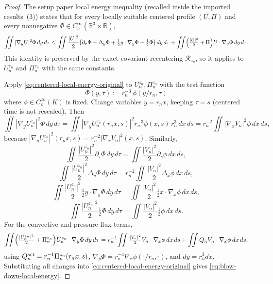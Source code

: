 \documentclass[11pt]{amsart}
\numberwithin{equation}{section}
\theoremstyle{plain}
\theoremstyle{definition}
\theoremstyle{remark}
\newcommand{\calR}{\mathcal R}
\begin{document}
\begin{proof}
The setup paper local energy inequality (recalled inside the imported results
\,(3)) states that for every locally suitable
centered profile \((U,\Pi)\) and every nonnegative
\(\Phi\in C_c^\infty(\mathbb R^3\times\mathbb R)\),
\begin{equation}\label{eq:centered-local-energy-original}
   \iint |\nabla_y U|^2\Phi\,dy\,d\tau
   \le
   \iint \frac{|U|^2}{2}\bigl(\partial_\tau\Phi+\Delta_y\Phi
      +\tfrac12 y\cdot\nabla_y\Phi+\tfrac12\Phi\bigr)\,dy\,d\tau
   +\iint
   \Bigl(\tfrac{|U|^2}{2}+\Pi\Bigr)U\cdot\nabla_y\Phi\,dy\,d\tau .
\end{equation}
This identity is preserved by the exact covariant recentering
\(\calR_{z_n}\), so it applies to \(U_n^{z_n}\) and \(\Pi_n^{z_n}\) with the
same constants.

Apply \eqref{eq:centered-local-energy-original} to \(U_n^{z_n},\Pi_n^{z_n}\)
with the test function
\[
   \Phi(y,\tau):=r_n^{-3}\,\phi(y/r_n,\tau)
\]
where \(\phi\in C_c^\infty(K)\) is fixed.  Change variables
\(y=r_nx\), keeping \(\tau=s\) (centered time is not rescaled).  Then
\[
   \iint|\nabla_yU_n^{z_n}|^2\Phi\,dy\,d\tau
   =\iint |\nabla_yU_n^{z_n}(r_nx,s)|^2 r_n^{-3}\phi(x,s)\,r_n^3\,dx\,ds
   =r_n^{-2}\iint|\nabla_xV_n|^2\phi\,dx\,ds ,
\]
because \(|\nabla_yU_n^{z_n}|^2(r_nx,s)=r_n^{-2}|\nabla_xV_n|^2(x,s)\).
Similarly,
\[
   \iint\frac{|U_n^{z_n}|^2}{2}\partial_\tau\Phi\,dy\,d\tau
   =\iint\frac{|V_n|^2}{2}\partial_s\phi\,dx\,ds ,
\]
\[
   \iint\frac{|U_n^{z_n}|^2}{2}\Delta_y\Phi\,dy\,d\tau
   =r_n^{-2}\iint\frac{|V_n|^2}{2}\Delta_x\phi\,dx\,ds ,
\]
\[
   \iint\frac{|U_n^{z_n}|^2}{2}\tfrac12 y\cdot\nabla_y\Phi\,dy\,d\tau
   =\iint\frac{|V_n|^2}{2}\tfrac12 x\cdot\nabla_x\phi\,dx\,ds ,
\]
\[
   \iint\frac{|U_n^{z_n}|^2}{2}\tfrac12\Phi\,dy\,d\tau
   =\iint\frac{|V_n|^2}{2}\tfrac12\phi\,dx\,ds .
\]
For the convective and pressure-flux terms,
\[
   \iint
   \Bigl(\tfrac{|U_n^{z_n}|^2}{2}+\Pi_n^{z_n}\Bigr)
   U_n^{z_n}\cdot\nabla_y\Phi\,dy\,d\tau
   =
   r_n^{-1}\!\iint
   \tfrac{|V_n|^2}{2}V_n\cdot\nabla_x\phi\,dx\,ds
   +\iint Q_nV_n\cdot\nabla_x\phi\,dx\,ds ,
\]
using \(Q_n^{\rm act}=r_n^{-1}\Pi_n^{z_n}(r_nx,s)\),
\(\nabla_y\Phi=r_n^{-4}\nabla_x\phi(\cdot/r_n,\cdot)\), and
\(dy=r_n^3dx\).  Substituting
all changes into \eqref{eq:centered-local-energy-original} gives
\eqref{eq:blow-down-local-energy}.


\end{proof}
\end{document}
